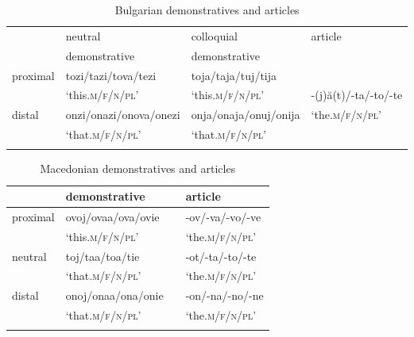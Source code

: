 \documentclass[output=paper]{langscibook}
\begin{document}
\begin{table}
\centering
\small
\setlength\tabcolsep{6pt}
 \begin{tabularx}{\textwidth}{llll}
  \lsptoprule
          & neutral  & colloquial  &  article \\
          & demonstrative & demonstrative & \\
  \midrule
  proximal  & tozi/tazi/tova/tezi &  toja/taja/tuj/tija  &  \\
    & `this.\textsc{m/f/n/pl}' & `this.\textsc{m/f/n/pl}' &-(j)ă(t)/-ta/-to/-te\\
  distal  &   onzi/onazi/onova/onezi & onja/onaja/onuj/onija & `the.\textsc{m/f/n/pl}'  \\
   & `that.\textsc{m/f/n/pl}' & `that.\textsc{m/f/n/pl}' & \\
  \lspbottomrule
 \end{tabularx}
 \caption{Bulgarian demonstratives and articles}
\label{tab:1}
\end{table}


\begin{table}
\centering
 \begin{tabularx}{\textwidth}{llll}
  \lsptoprule
          & demonstrative &  &  article \\
  \midrule
  proximal  & ovoj/ovaa/ova/ovie &   & -ov/-va/-vo/-ve \\
  & `this.\textsc{m/f/n/pl}' &  & `the.\textsc{m/f/n/pl}'\\
  neutral & toj/taa/toa/tie & &  -ot/-ta/-to/-te \\
 & `that.\textsc{m/f/n/pl}' & & `the.\textsc{m/f/n/pl}'\\
  distal  &   onoj/onaa/ona/onie &  & -on/-na/-no/-ne  \\
 & `that.\textsc{m/f/n/pl}' &  & `the.\textsc{m/f/n/pl}'\\
  \lspbottomrule
 \end{tabularx}
 \caption{Macedonian demonstratives and articles}
\label{tab:2}
\end{table}
\end{document}
